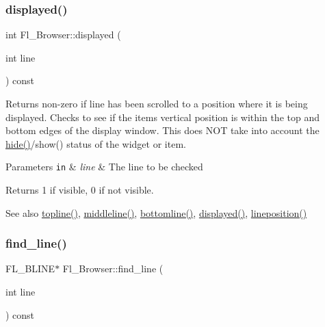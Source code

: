 \mbox{\label{class_fl___browser_aae4acb216ae3ae6261bd06fb9457e804}} 
\subsubsection{\texorpdfstring{displayed()}{displayed()}}
{\footnotesize\ttfamily int Fl\+\_\+\+Browser\+::displayed (\begin{DoxyParamCaption}\item[{int}]{line }\end{DoxyParamCaption}) const\hspace{0.3cm}{\ttfamily [inline]}}

Returns non-\/zero if {\ttfamily line} has been scrolled to a position where it is being displayed. Checks to see if the item\textquotesingle{}s vertical position is within the top and bottom edges of the display window. This does N\+OT take into account the \hyperlink{class_fl___browser_a23c16146f17a31b4e952a717b6f6f12d}{hide()}/show() status of the widget or item. 
\begin{DoxyParams}[1]{Parameters}
\mbox{\tt in}  & {\em line} & The line to be checked \\
\hline
\end{DoxyParams}
\begin{DoxyReturn}{Returns}
1 if visible, 0 if not visible. 
\end{DoxyReturn}
\begin{DoxySeeAlso}{See also}
\hyperlink{class_fl___browser_a4064f948e0191a8d7a0a4b39aaa632cd}{topline()}, \hyperlink{class_fl___browser_aeed63f2ef05839563c626c349fc40292}{middleline()}, \hyperlink{class_fl___browser_ad74d4d85549d4563a584ab0759832f6d}{bottomline()}, \hyperlink{class_fl___browser_aae4acb216ae3ae6261bd06fb9457e804}{displayed()}, \hyperlink{class_fl___browser_ab1266ecc779babeef0825e935d873dff}{lineposition()} 
\end{DoxySeeAlso}
\mbox{\label{class_fl___browser_abefae9979ef09100d0c4c811cb3dedd7}} 
\subsubsection{\texorpdfstring{find\+\_\+line()}{find\_line()}}
{\footnotesize\ttfamily F\+L\+\_\+\+B\+L\+I\+NE$\ast$ Fl\+\_\+\+Browser\+::find\+\_\+line (\begin{DoxyParamCaption}\item[{int}]{line }\end{DoxyParamCaption}) const\hspace{0.3cm}{\ttfamily [protected]}}

